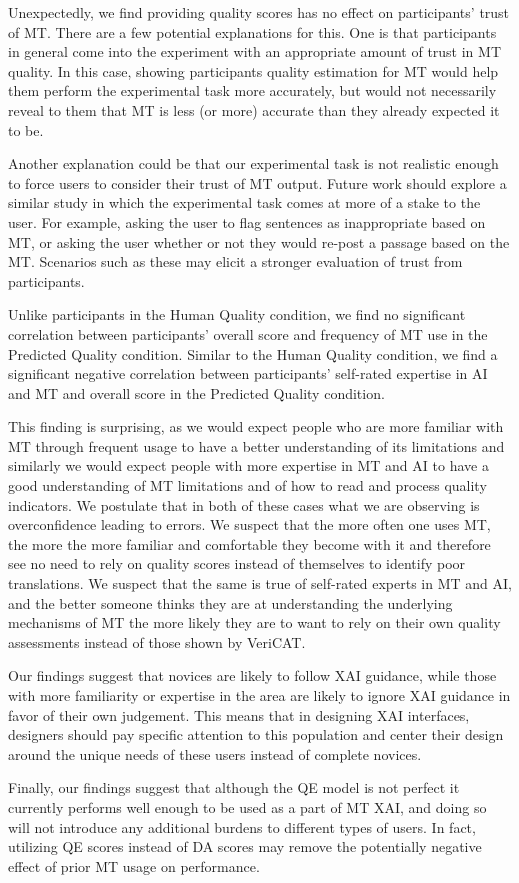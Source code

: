 Unexpectedly, we find providing quality scores has no effect on participants' trust of MT. There are a few potential explanations for this. One is that participants in general come into the experiment with an appropriate amount of trust in MT quality. In this case, showing participants quality estimation for MT would help them perform the experimental task more accurately, but would not necessarily reveal to them that MT is less (or more) accurate than they already expected it to be. 

Another explanation could be that our experimental task is not realistic enough to force users to consider their trust of MT output. Future work should explore a similar study in which the experimental task comes at more of a stake to the user. For example, asking the user to flag sentences as inappropriate based on MT, or asking the user whether or not they would re-post a passage based on the MT. Scenarios such as these may elicit a stronger evaluation of trust from participants.

Unlike participants in the Human Quality condition, we find no significant correlation between participants' overall score and frequency of MT use in the Predicted Quality condition. Similar to the Human Quality condition, we find a significant negative correlation between participants' self-rated expertise in AI and MT and overall score in the Predicted Quality condition.  

This finding is surprising, as we would expect people who are more familiar with MT through frequent usage to have a better understanding of its limitations and similarly we would expect people with more expertise in MT and AI to have a good understanding of MT limitations and of how to read and process quality indicators. We postulate that in both of these cases what we are observing is overconfidence leading to errors. We suspect that the more often one uses MT, the more the more familiar and comfortable they become with it and therefore see no need to rely on quality scores instead of themselves to identify poor translations. We suspect that the same is true of self-rated experts in MT and AI, and the better someone thinks they are at understanding the underlying mechanisms of MT the more likely they are to want to rely on their own quality assessments instead of those shown by VeriCAT.

Our findings suggest that novices are likely to follow XAI guidance, while those with more familiarity or expertise in the area are likely to ignore XAI guidance in favor of their own judgement. This means that in designing XAI interfaces, designers should pay specific attention to this population and center their design around the unique needs of these users instead of complete novices. 

Finally, our findings suggest that although the QE model is not perfect it currently performs well enough to be used as a part of MT XAI, and doing so will not introduce any additional burdens to different types of users. In fact, utilizing QE scores instead of DA scores may remove the potentially negative effect of prior MT usage on performance.  


